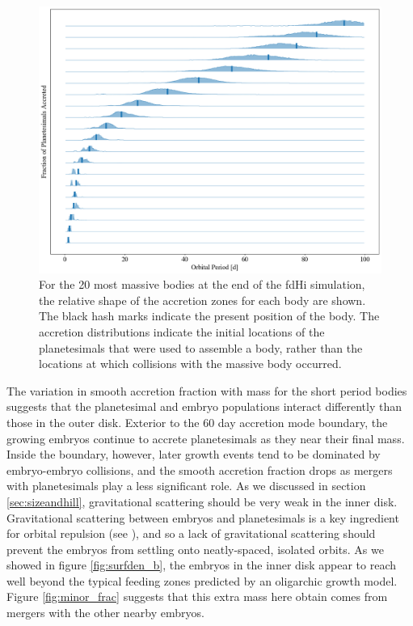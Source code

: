 \documentclass[twocolumn]{aastex63}
\begin{document}
\begin{figure}
\begin{center}
    \includegraphics[width=\textwidth]{figures/acc_zones.png}
    \caption{For the 20 most massive bodies at the end of the fdHi simulation, the relative shape of the accretion zones for each body are shown. The black hash marks indicate the present position of the body. The accretion distributions indicate the initial locations of the planetesimals that were used to assemble a body, rather than the locations at which collisions with the massive body occurred.\label{fig:acc_zones}}
\end{center}
\end{figure}

The variation in smooth accretion fraction with mass for the short period bodies suggests that the planetesimal and embryo populations interact differently than those in the outer disk. Exterior to the 60 day accretion mode boundary, the growing embryos continue to accrete planetesimals as they near their final mass. Inside the boundary, however, later growth events tend to be dominated by embryo-embryo collisions, and the smooth accretion fraction drops as mergers with planetesimals play a less significant role. As we discussed in section \ref{sec:sizeandhill}, gravitational scattering should be very weak in the inner disk. Gravitational scattering between embryos and planetesimals is a key ingredient for orbital repulsion (see \citet{kokubo98}), and so a lack of gravitational scattering should prevent the embryos from settling onto neatly-spaced, isolated orbits. As we showed in figure \ref{fig:surfden_b}, the embryos in the inner disk appear to reach well beyond the typical feeding zones predicted by an oligarchic growth model. Figure \ref{fig:minor_frac} suggests that this extra mass here obtain comes from mergers with the other nearby embryos.
\end{document}
